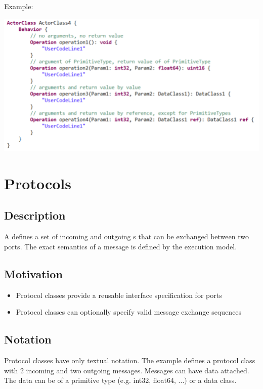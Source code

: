 Example:

\includegraphics{images/040-ActorClassOperations.png}

\section{Protocols}

\subsection{Description}

A  defines a set of incoming and outgoing s that can be exchanged between two ports.
The exact semantics of a message is defined by the execution model.

\subsection{Motivation}

\begin{itemize}
\item Protocol classes provide a reusable interface specification for ports
\item Protocol classes can optionally specify valid message exchange sequences
\end{itemize}

\subsection{Notation}

Protocol classes have only textual notation. 
The example defines a protocol class with 2 incoming and two outgoing messages. Messages can have data 
attached. The data can be of a primitive type (e.g. int32, float64, ...) or a data class.

